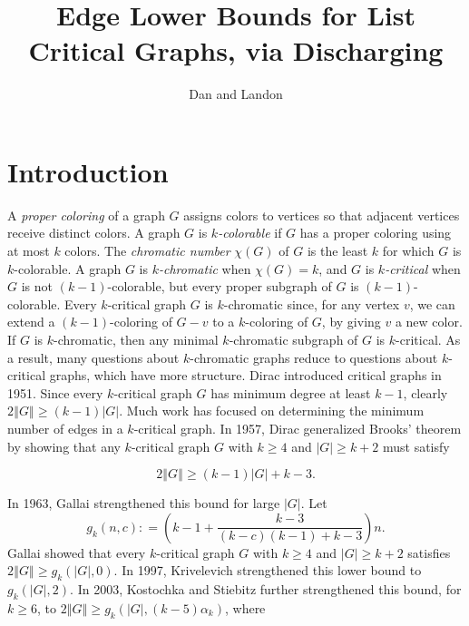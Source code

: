 \documentclass[12pt]{article}
\title{Edge Lower Bounds for List Critical Graphs, via Discharging}
\author{Dan and Landon}
\theoremstyle{plain}
\theoremstyle{definition}
\theoremstyle{remark}
\newcommand{\fancy}[1]{\mathcal{#1}}
\newcommand{\T}{\fancy{T}}
\newcommand{\card}[1]{\left|#1\right|}
\newcommand{\size}[1]{\left\Vert#1\right\Vert}
\newcommand{\parens}[1]{\left( #1 \right)}
\newcommand{\DefinedAs}{\mathrel{\mathop:}=}
\begin{document}
\maketitle

\section{Introduction}

A \emph{proper coloring} of a graph $G$ assigns colors to vertices so that adjacent vertices receive distinct colors.  A graph $G$ is \emph{$k$-colorable} if $G$ has a proper coloring using at most $k$ colors.
The \emph{chromatic number} $\chi(G)$ of $G$ is the least $k$ for which $G$ is $k$-colorable. A graph $G$ is \emph{$k$-chromatic} when $\chi(G) = k$, and $G$ is \emph{$k$-critical} when $G$ is not $(k-1)$-colorable, but every proper subgraph of $G$ is $(k-1)$-colorable.  Every $k$-critical graph $G$ is $k$-chromatic since, for any vertex $v$, we can extend a $(k-1)$-coloring of $G-v$ to a $k$-coloring of $G$, by giving $v$ a new color.  If $G$ is $k$-chromatic, then any minimal $k$-chromatic subgraph of $G$ is $k$-critical.  As a result, many questions about $k$-chromatic graphs reduce to questions about $k$-critical graphs, which have more structure.  Dirac \cite{dirac1951note} introduced critical graphs in 1951.  Since every $k$-critical graph $G$ has minimum degree at least $k-1$, clearly $2\size{G} \ge (k-1)\card{G}$.  Much work has focused on determining the minimum number of edges in a $k$-critical graph. In 1957, Dirac \cite{dirac1957theorem} generalized Brooks' theorem \cite{brooks1941colouring} by showing that any $k$-critical graph $G$ with $k \ge 4$ and $\card{G} \ge k+2$ must satisfy 

\[2\size{G} \ge (k-1)\card{G} + k-3.\]

In 1963, Gallai \cite{gallai1963kritische} strengthened this bound for large $\card{G}$.  Let 
\[g_k(n, c) \DefinedAs \parens{k-1 + \frac{k-3}{(k-c)(k-1) + k-3}}n.\]
Gallai showed that every $k$-critical graph $G$ with $k \ge 4$ and $\card{G} \ge k+2$ satisfies $2\size{G} \ge g_k(\card{G}, 0)$.  In 1997, Krivelevich \cite{krivelevich1997minimal} strengthened this lower bound to $g_k(\card{G}, 2)$.  In 2003, Kostochka and Stiebitz \cite{kostochkastiebitzedgesincriticalgraph} further strengthened this bound, for $k \ge 6$, to $2\size{G} \ge g_k(\card{G}, (k-5)\alpha_k)$, where
\end{document}
